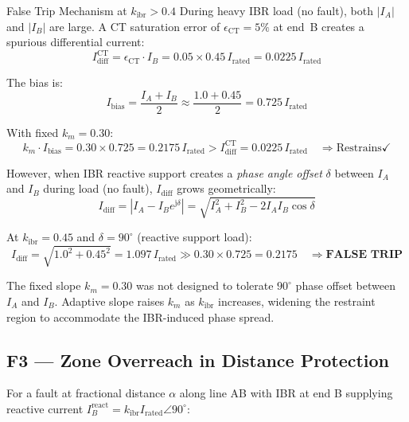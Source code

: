 \documentclass[12pt,a4paper]{article}
\newcommand{\kibr}{k_\mathrm{ibr}}
\newcommand{\Irated}{I_\mathrm{rated}}
\newcommand{\Idiff}{I_\mathrm{diff}}
\newcommand{\Ibias}{I_\mathrm{bias}}
\newcommand{\km}{k_m}
\newcommand{\jj}{\mathrm{j}}
\begin{document}
\begin{warnbox}{False Trip Mechanism at $\kibr > 0.4$}
During heavy IBR load (no fault), both $|I_A|$ and $|I_B|$ are large.
A CT saturation error of $\epsilon_\mathrm{CT} = 5\%$ at end~B creates
a spurious differential current:
\begin{equation}
  \Idiff^\mathrm{CT} = \epsilon_\mathrm{CT} \cdot I_B = 0.05 \times 0.45\,\Irated = 0.0225\,\Irated
\end{equation}

The bias is:
\begin{equation}
  \Ibias = \frac{I_A + I_B}{2} \approx \frac{1.0 + 0.45}{2} = 0.725\,\Irated
\end{equation}

With fixed $\km = 0.30$:
\begin{equation}
  \km \cdot \Ibias = 0.30 \times 0.725 = 0.2175\,\Irated
  > \Idiff^\mathrm{CT} = 0.0225\,\Irated \quad \Rightarrow \text{Restrains} \checkmark
\end{equation}

However, when IBR reactive support creates a \emph{phase angle offset} $\delta$ between
$I_A$ and $I_B$ during load (no fault), $\Idiff$ grows geometrically:
\begin{equation}
  \Idiff = |I_A - I_B e^{\jj\delta}|
         = \sqrt{I_A^2 + I_B^2 - 2I_A I_B\cos\delta}
\end{equation}

At $\kibr = 0.45$ and $\delta = 90^\circ$ (reactive support load):
\begin{equation}
  \Idiff = \sqrt{1.0^2 + 0.45^2} = 1.097\,\Irated \gg 0.30 \times 0.725 = 0.2175
  \quad \Rightarrow \textbf{FALSE TRIP}
\end{equation}

The fixed slope $\km = 0.30$ was not designed to tolerate $90^\circ$ phase offset
between $I_A$ and $I_B$.  Adaptive slope raises $\km$ as $\kibr$ increases,
widening the restraint region to accommodate the IBR-induced phase spread.
\end{warnbox}

\subsection{F3 --- Zone Overreach in Distance Protection}

For a fault at fractional distance $\alpha$ along line AB with IBR at end B
supplying reactive current $I_B^\mathrm{react} = \kibr\Irated\angle 90^\circ$:
\end{document}
